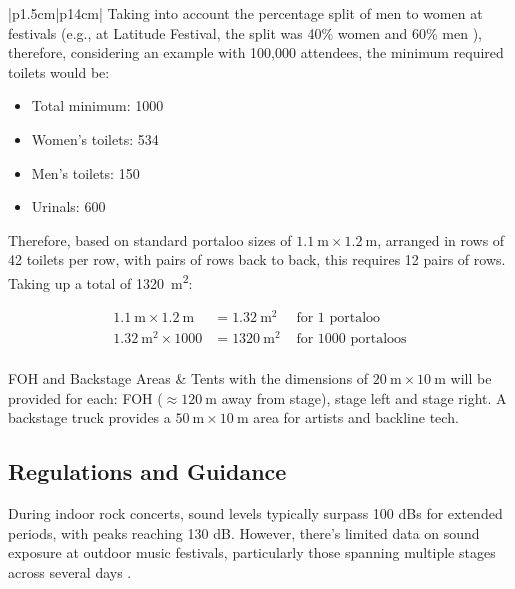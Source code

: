 \begin{longtable}{|p{1.5cm}|p{14cm}|}
                Taking into account the percentage split of men to women at festivals (e.g., at Latitude Festival, the split was 40\% women and 60\% men \citep{aawbi2019}), therefore, considering an example with 100,000 attendees, the minimum required toilets would be:
                
                \begin{itemize}
                    \item Total minimum: 1000
                    \item Women's toilets: 534
                    \item Men's toilets: 150
                    \item Urinals: 600
                \end{itemize}
                
                Therefore, based on standard portaloo sizes of $\SI{1.1}{\metre} \times \SI{1.2}{\metre}$, arranged in rows of 42 toilets per row, with pairs of rows back to back, this requires 12 pairs of rows. Taking up a total of \SI{1320}{\metre\squared}:

                \[
                    \begin{aligned}
                    \SI{1.1}{\metre} \times \SI{1.2}{\metre} &= \SI{1.32}{\metre\squared} &\text{ for 1 portaloo}\\
                    \SI{1.32}{\metre\squared} \times 1000 &= \SI{1320}{\metre\squared} &\text{ for 1000 portaloos}
                    \end{aligned}
                \]
            \\
            \hline
            FOH and Backstage Areas &
                Tents with the dimensions of $\SI{20}{\metre} \times \SI{10}{\metre}$ will be provided for each: FOH ($\approx \SI{120}{\metre}$ away from stage), stage left and stage right. A backstage truck provides a $\SI{50}{\metre} \times \SI{10}{\metre}$ area for artists and backline tech.
            \\
            \hline

            \caption{Calculation of all amenities}
            \label{tab:amenities_calcs}
        \end{longtable}

    \subsection{Regulations and Guidance}
        During indoor rock concerts, sound levels typically surpass 100 dBs for extended periods, with peaks reaching 130 dB. However, there's limited data on sound exposure at outdoor music festivals, particularly those spanning multiple stages across several days \citep{rmbrecht2023}.

